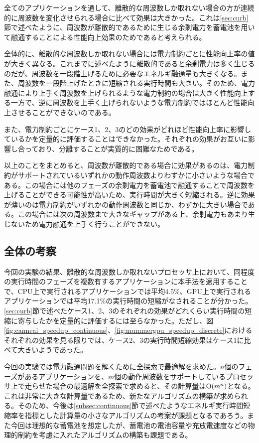 全てのアプリケーションを通して、離散的な周波数しか取れない場合の方が連続的に周波数を変化させられる場合に比べて効果は大きかった。これは\ref{sec:curb}節で述べたように、周波数が離散的であるために生じる余剰電力を蓄電池を用いて融通することによる性能向上効果のためであると考えられる。

全体的に、離散的な周波数しか取れない場合には電力制約ごとに性能向上率の値が大きく異なる。これまでに述べたように離散的であると余剰電力は多く生じるのだが、周波数を一段階上げるために必要なエネルギ融通量も大きくなる。また、周波数を一段階上げたときに短縮される実行時間も大きい。そのため、電力融通により上手く周波数を上げられるような電力制約の場合は大きく性能向上する一方で、逆に周波数を上手く上げられないような電力制約ではほとんど性能向上させることができないのである。

また、電力制約ごとにケース1、2、3のどの効果がどれほど性能向上率に影響しているかを定量的に評価することはできなかった。それぞれの効果がお互いに影響し合っており、分離することが実質的に困難なためである。

以上のことをまとめると、周波数が離散的である場合に効果があるのは、電力制約がサポートされているいずれかの動作周波数よりわずかに小さいような場合である。この場合には他のフェーズの余剰電力を蓄電池で融通することで周波数を上げることができる可能性が高いため、実行時間が大きく短縮される。逆に効果が薄いのは電力制約がいずれかの動作周波数と同じか、わずかに大きい場合である。この場合には次の周波数まで大きなギャップがある上、余剰電力もあまり生じないため電力融通を上手く行うことができない。


\subsection{全体の考察}
\label{sebsec:whole}

今回の実験の結果、離散的な周波数しか取れないプロセッサ上において、同程度の実行時間のフェーズを複数有するアプリケーションに本手法を適用することで、CPU上で実行されるアプリケーションでは平均4.5\%、GPU上で実行されるアプリケーションでは平均17.1\%の実行時間の短縮がなされることが分かった。\ref{sec:curb}節で述べたケース1、2、3のそれぞれの効果がどれくらい実行時間の短縮に寄与したかを定量的に評価するには至らなかった。ただし、図\ref{fig:canneal_speedup_continuous}、\ref{fig:mummergpu_speedup_discrete}におけるそれぞれの効果を見る限りでは、ケース2、3の実行時間短縮効果はケース1に比べて大きいようであった。

今回の実験では電力融通問題を解くために全探索で最適解を求めた。$n$個のフェーズがあるアプリケーションを、$m$個の動作周波数をサポートしているプロセッサ上で走らせた場合の最適解を全探索で求めると、その計算量は${\rm O}(m^n)$となる。これは非常に大きな計算量であるため、新たなアルゴリズムの構築が求められる。そのため、今後は\ref{subsec:continuous}節で述べたようなエネルギ実行時間短縮率を指標とした計算量の小さなアルゴリズムの考案が課題となるであろう。また今回は理想的な蓄電池を想定したが、蓄電池の電池容量や充放電速度などの物理的制約を考慮に入れたアルゴリズムの構築も課題である。











